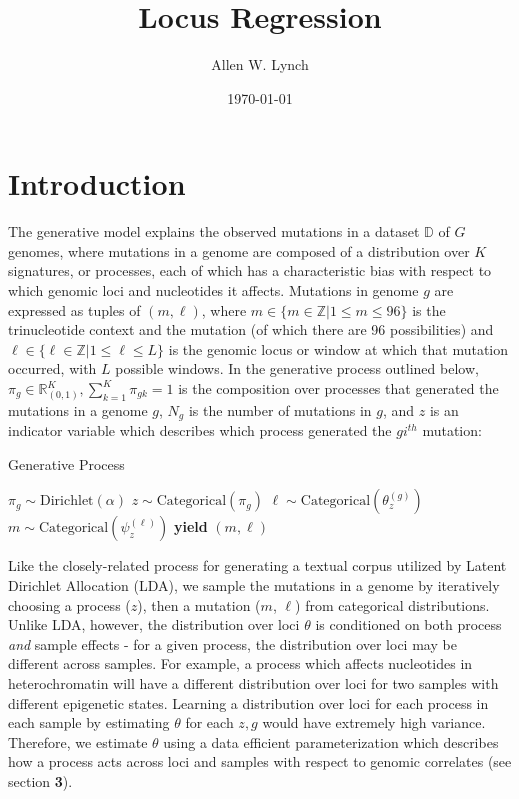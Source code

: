 \documentclass{article}
\author{Allen W. Lynch}
\title{Locus Regression}
\date{\today}
\begin{document}
\maketitle

\section{Introduction}

The generative model explains the observed mutations in a dataset $\mathbb{D}$ of $G$ genomes, where mutations in a genome are composed of a 
distribution over $K$ signatures, or processes, each of which has a characteristic bias with respect to which genomic loci and nucleotides it affects. 
Mutations in genome $g$ are expressed as tuples of $(m,\ell)$, where $m \in \{ m \in \mathbb{Z} | 1 \leq m \leq 96\}$ is the trinucleotide context and the mutation (of which there are 96 possibilities)
and $\ell \in \{ \ell \in \mathbb{Z} | 1 \leq \ell \leq L \}$ is the genomic locus or window at which that mutation occurred, with $L$ possible windows. 
In the generative process outlined below, $\pi_g \in \mathbb{R}_{(0,1)}^K, \sum_{k=1}^K \pi_{gk} = 1$ is the composition over processes that generated the mutations in a genome $g$,
$N_g$ is the number of mutations in $g$, and $z$ is an indicator variable which describes which process generated the $gi^{th}$ mutation:

\begin{algorithm}
\caption{Generative Process}
\begin{algorithmic}
  \scriptsize
  	\STATE $ \pi_g \sim \textrm{Dirichlet}( \alpha ) $
  		\STATE $ z \sim \textrm{Categorical}( \pi_g ) $
  		\STATE $ \ell \sim \textrm{Categorical}( \theta^{(g)}_{z} ) $
  		\STATE $ m \sim \textrm{Categorical}( \psi^{(\ell)}_z ) $
  		\STATE \textbf{yield} $(m,\ell)$
  	\ENDFOR
  \ENDFOR
\end{algorithmic}
\end{algorithm}

Like the closely-related process for generating a textual corpus utilized by Latent Dirichlet Allocation (LDA), we sample the mutations in a genome by
iteratively choosing a process ($z$), then a mutation ($m$, $\ell$) from categorical distributions. Unlike LDA, however, the distribution over loci $\theta$ 
is conditioned on both process \emph{and} sample effects - for a given process, the distribution over loci may be different across samples. For example, a process which
affects nucleotides in heterochromatin will have a different distribution over loci for two samples with different epigenetic states. Learning a distribution over loci for 
each process in each sample by estimating $\theta$ for each $z,g$ would have extremely high variance.
Therefore, we estimate $\theta$ using a data efficient parameterization which describes how a process acts across loci and samples with respect to genomic correlates (see section \textbf{3}).
\end{document}
